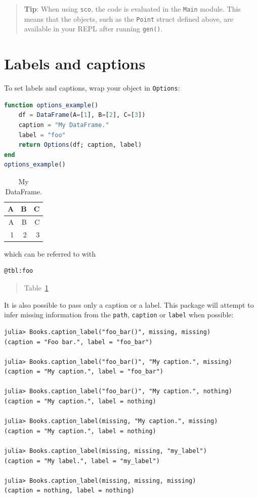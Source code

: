\documentclass[
  notoc %
]{tufte-book}
\newcommand{\passthrough}[1]{#1}
\begin{document}
\begin{quote}
\textbf{Tip}: When using \passthrough{\lstinline!sco!}, the code is
evaluated in the \passthrough{\lstinline!Main!} module. This means that
the objects, such as the \passthrough{\lstinline!Point!} struct defined
above, are available in your REPL after running
\passthrough{\lstinline!gen()!}.
\end{quote}

\hypertarget{sec:labels-captions}{%
\section{Labels and captions}\label{sec:labels-captions}}

To set labels and captions, wrap your object in
\passthrough{\lstinline!Options!}:

\begin{lstlisting}[language=Julia]
function options_example()
    df = DataFrame(A=[1], B=[2], C=[3])
    caption = "My DataFrame."
    label = "foo"
    return Options(df; caption, label)
end
options_example()
\end{lstlisting}

\hypertarget{tbl:foo}{}
\begin{longtable}[]{@{}rrr@{}}
\caption{\label{tbl:foo}My DataFrame.}\tabularnewline
\toprule
A & B & C \\
\midrule
\endfirsthead
\toprule
A & B & C \\
\midrule
\endhead
1 & 2 & 3 \\
\bottomrule
\end{longtable}

which can be referred to with

\begin{lstlisting}
@tbl:foo
\end{lstlisting}

\begin{quote}
Table~\ref{tbl:foo}
\end{quote}

It is also possible to pass only a caption or a label. This package will
attempt to infer missing information from the
\passthrough{\lstinline!path!}, \passthrough{\lstinline!caption!} or
\passthrough{\lstinline!label!} when possible:

\begin{lstlisting}[language=Output]
julia> Books.caption_label("foo_bar()", missing, missing)
(caption = "Foo bar.", label = "foo_bar")

julia> Books.caption_label("foo_bar()", "My caption.", missing)
(caption = "My caption.", label = "foo_bar")

julia> Books.caption_label("foo_bar()", "My caption.", nothing)
(caption = "My caption.", label = nothing)

julia> Books.caption_label(missing, "My caption.", missing)
(caption = "My caption.", label = nothing)

julia> Books.caption_label(missing, missing, "my_label")
(caption = "My label.", label = "my_label")

julia> Books.caption_label(missing, missing, missing)
(caption = nothing, label = nothing)
\end{lstlisting}
\end{document}
